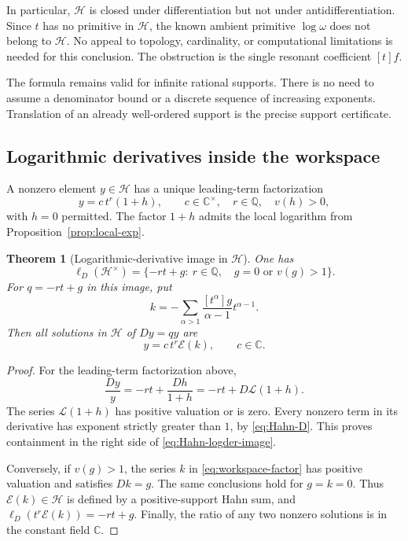 \documentclass[11pt,a4paper]{article}
\numberwithin{equation}{section}
\newtheorem{theorem}{Theorem}[section]
\theoremstyle{definition}
\theoremstyle{remark}
\newcommand{\C}{\mathbb C}
\newcommand{\Q}{\mathbb Q}
\newcommand{\HH}{\mathscr H}
\newcommand{\EE}{\mathcal E}
\newcommand{\LL}{\mathcal L}
\newcommand{\Dlog}{\ell_D}
\begin{document}
In particular, $\HH$ is closed under differentiation but not under
antidifferentiation. Since $t$ has no primitive in $\HH$, the known ambient
primitive $\log\omega$ does not belong to $\HH$. No appeal to topology,
cardinality, or computational limitations is needed for this conclusion.
The obstruction is the single resonant coefficient $[t]f$.

The formula remains valid for infinite rational supports. There is no need
to assume a denominator bound or a discrete sequence of increasing
exponents. Translation of an already well-ordered support is the precise
support certificate.

\subsection{Logarithmic derivatives inside the workspace}

A nonzero element $y\in\HH$ has a unique leading-term factorization
\[
 y=c\,t^r(1+h),\qquad c\in\C^\times,\quad r\in\Q,\quad v(h)>0,
\]
with $h=0$ permitted. The factor $1+h$ admits the local logarithm from
Proposition~\ref{prop:local-exp}.

\begin{theorem}[Logarithmic-derivative image in $\HH$]
\label{thm:Hahn-logder}
One has
\begin{equation}\label{eq:Hahn-logder-image}
 \Dlog(\HH^\times)
 =\{-r t+g:\ r\in\Q,\quad g=0\text{ or }v(g)>1\}.
\end{equation}
For $q=-r t+g$ in this image, put
\begin{equation}\label{eq:workspace-factor}
 k=-\sum_{\alpha>1}\frac{[t^\alpha]g}{\alpha-1}t^{\alpha-1}.
\end{equation}
Then all solutions in $\HH$ of $Dy=qy$ are
\begin{equation}\label{eq:Hahn-all}
 y=c\,t^r\EE(k),\qquad c\in\C.
\end{equation}
\end{theorem}
\begin{proof}
For the leading-term factorization above,
\[
 \frac{Dy}{y}=-r t+\frac{Dh}{1+h}
             =-r t+D\LL(1+h).
\]
The series $\LL(1+h)$ has positive valuation or is zero. Every nonzero
term in its derivative has exponent strictly greater than $1$, by
\eqref{eq:Hahn-D}. This proves containment in the right side of
\eqref{eq:Hahn-logder-image}.

Conversely, if $v(g)>1$, the series $k$ in
\eqref{eq:workspace-factor} has positive valuation and satisfies $Dk=g$.
The same conclusions hold for $g=k=0$. Thus
$\EE(k)\in\HH$ is defined by a positive-support Hahn sum, and
$\Dlog(t^r\EE(k))=-rt+g$. Finally, the ratio of any two nonzero
solutions is in the constant field $\C$.
\end{proof}
\end{document}
